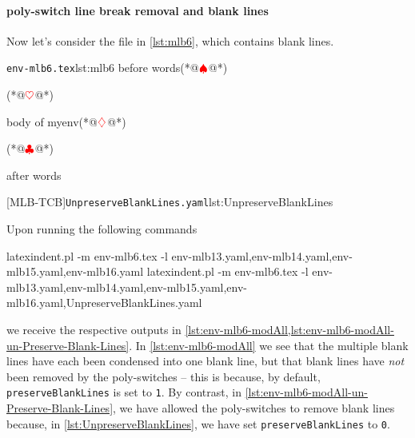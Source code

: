  \paragraph{poly-switch line break removal and blank lines}
  \begin{example}
  Now let's consider the file in \cref{lst:mlb6}, which contains blank lines.

  \begin{cmhtcbraster}
   \begin{cmhlistings}[style=tcblatex,escapeinside={(*@}{@*)}]{\texttt{env-mlb6.tex}}{lst:mlb6}
before words(*@$\color{red}\spadesuit$@*)


\begin{myenv}(*@$\color{red}\heartsuit$@*)


body of myenv(*@$\color{red}\diamondsuit$@*)


\end{myenv}(*@$\color{red}\clubsuit$@*)

after words
\end{cmhlistings}
   [MLB-TCB]{\texttt{UnpreserveBlankLines.yaml}}{lst:UnpreserveBlankLines}
  \end{cmhtcbraster}

  Upon running the following commands  
  \begin{widepage}

   \begin{commandshell}
latexindent.pl -m env-mlb6.tex -l env-mlb13.yaml,env-mlb14.yaml,env-mlb15.yaml,env-mlb16.yaml
latexindent.pl -m env-mlb6.tex -l env-mlb13.yaml,env-mlb14.yaml,env-mlb15.yaml,env-mlb16.yaml,UnpreserveBlankLines.yaml
\end{commandshell}

  \end{widepage}
  we receive the respective outputs in
  \cref{lst:env-mlb6-modAll,lst:env-mlb6-modAll-un-Preserve-Blank-Lines}. In
  \cref{lst:env-mlb6-modAll} we see that the multiple blank lines have each been condensed
  into one blank line, but that blank lines have \emph{not} been removed by the
  poly-switches -- this is because, by default, \texttt{preserveBlankLines} is set to
  \texttt{1}. By contrast, in \cref{lst:env-mlb6-modAll-un-Preserve-Blank-Lines}, we have
  allowed the poly-switches to remove blank lines because, in
  \cref{lst:UnpreserveBlankLines}, we have set \texttt{preserveBlankLines} to \texttt{0}.


\end{example}
